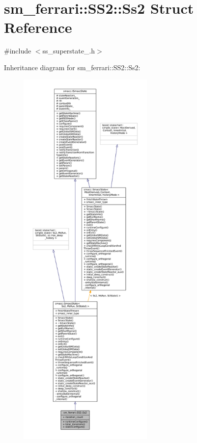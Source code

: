 \hypertarget{structsm__ferrari_1_1SS2_1_1Ss2}{}\section{sm\+\_\+ferrari\+:\+:S\+S2\+:\+:Ss2 Struct Reference}
\label{structsm__ferrari_1_1SS2_1_1Ss2}


{\ttfamily \#include $<$ss\+\_\+superstate\+\_.\+h$>$}



Inheritance diagram for sm\+\_\+ferrari\+:\+:S\+S2\+:\+:Ss2\+:
\nopagebreak
\begin{figure}[H]
\begin{center}
\leavevmode
\includegraphics[height=550pt]{structsm__ferrari_1_1SS2_1_1Ss2__inherit__graph}
\end{center}
\end{figure}


